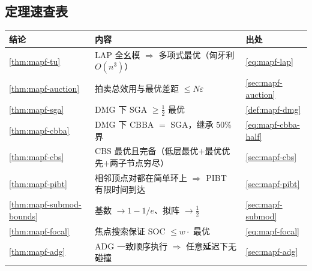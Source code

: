 \subsection*{定理速查表}
\begin{table}[H]\centering\small
\begin{tabular}{lll}
\toprule
结论 & 内容 & 出处 \\
\midrule
\cref{thm:mapf-tu} & LAP 全幺模 $\Rightarrow$ 多项式最优（匈牙利 $O(n^3)$） & \cref{eq:mapf-lap} \\
\cref{thm:mapf-auction} & 拍卖总效用与最优差距 $\le N\varepsilon$ & \cref{sec:mapf-auction} \\
\cref{thm:mapf-sga} & DMG 下 SGA $\ge\tfrac12$ 最优 & \cref{def:mapf-dmg} \\
\cref{thm:mapf-cbba} & DMG 下 CBBA $=$ SGA，继承 $50\%$ 界 & \cref{eq:mapf-cbba-half} \\
\cref{thm:mapf-cbs} & CBS 最优且完备（低层最优$+$最优优先$+$两子节点穷尽） & \cref{sec:mapf-cbs} \\
\cref{thm:mapf-pibt} & 相邻顶点对都在简单环上 $\Rightarrow$ PIBT 有限时间到达 & \cref{sec:mapf-pibt} \\
\cref{thm:mapf-submod-bounds} & 基数 $\to 1-1/e$、拟阵 $\to\tfrac12$ & \cref{sec:mapf-submod} \\
\cref{thm:mapf-focal} & 焦点搜索保证 SOC $\le w\cdot$ 最优 & \cref{eq:mapf-focal} \\
\cref{thm:mapf-adg} & ADG 一致顺序执行 $\Rightarrow$ 任意延迟下无碰撞 & \cref{sec:mapf-adg} \\
\bottomrule
\end{tabular}
\end{table}

